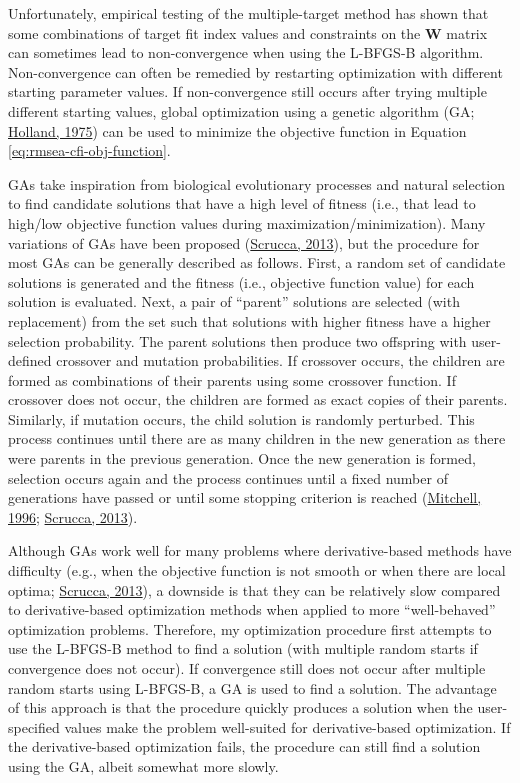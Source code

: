 \documentclass[11pt]{umnthesis}
\begin{document}
Unfortunately, empirical testing of the multiple-target method has shown that some combinations of target fit index values and constraints on the \(\mathbf{W}\) matrix can sometimes lead to non-convergence when using the L-BFGS-B algorithm. Non-convergence can often be remedied by restarting optimization with different starting parameter values. If non-convergence still occurs after trying multiple different starting values, global optimization using a genetic algorithm (GA; \protect\hyperlink{ref-holland1975}{Holland, 1975}) can be used to minimize the objective function in Equation \eqref{eq:rmsea-cfi-obj-function}.

GAs take inspiration from biological evolutionary processes and natural selection to find candidate solutions that have a high level of fitness (i.e., that lead to high/low objective function values during maximization/minimization). Many variations of GAs have been proposed (\protect\hyperlink{ref-scrucca2013}{Scrucca, 2013}), but the procedure for most GAs can be generally described as follows. First, a random set of candidate solutions is generated and the fitness (i.e., objective function value) for each solution is evaluated. Next, a pair of ``parent'' solutions are selected (with replacement) from the set such that solutions with higher fitness have a higher selection probability. The parent solutions then produce two offspring with user-defined crossover and mutation probabilities. If crossover occurs, the children are formed as combinations of their parents using some crossover function. If crossover does not occur, the children are formed as exact copies of their parents. Similarly, if mutation occurs, the child solution is randomly perturbed. This process continues until there are as many children in the new generation as there were parents in the previous generation. Once the new generation is formed, selection occurs again and the process continues until a fixed number of generations have passed or until some stopping criterion is reached (\protect\hyperlink{ref-mitchell1996}{Mitchell, 1996}; \protect\hyperlink{ref-scrucca2013}{Scrucca, 2013}).

Although GAs work well for many problems where derivative-based methods have difficulty (e.g., when the objective function is not smooth or when there are local optima; \protect\hyperlink{ref-scrucca2013}{Scrucca, 2013}), a downside is that they can be relatively slow compared to derivative-based optimization methods when applied to more ``well-behaved'' optimization problems. Therefore, my optimization procedure first attempts to use the L-BFGS-B method to find a solution (with multiple random starts if convergence does not occur). If convergence still does not occur after multiple random starts using L-BFGS-B, a GA is used to find a solution. The advantage of this approach is that the procedure quickly produces a solution when the user-specified values make the problem well-suited for derivative-based optimization. If the derivative-based optimization fails, the procedure can still find a solution using the GA, albeit somewhat more slowly.
\end{document}
